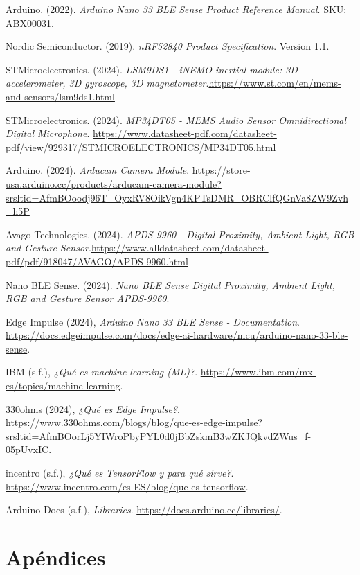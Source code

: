 \documentclass[12pt,a4paper]{article}
\begin{document}
\begin{thebibliography}{}
Arduino. (2022). \emph{Arduino Nano 33 BLE Sense Product Reference Manual}. SKU: ABX00031.

Nordic Semiconductor. (2019). \emph{nRF52840 Product Specification}. Version 1.1.  

STMicroelectronics. (2024). \emph{LSM9DS1 - iNEMO inertial module: 3D accelerometer, 3D gyroscope, 3D magnetometer}.\url{https://www.st.com/en/mems-and-sensors/lsm9ds1.html}

STMicroelectronics. (2024). \emph{MP34DT05 - MEMS Audio Sensor Omnidirectional Digital Microphone}. \url{https://www.datasheet-pdf.com/datasheet-pdf/view/929317/STMICROELECTRONICS/MP34DT05.html}


Arduino. (2024). \emph{Arducam Camera Module}. \url{https://store-usa.arduino.cc/products/arducam-camera-module?srsltid=AfmBOoodj96T_OyxRV8OikVgn4KPTsDMR_OBRClfQGnVa8ZW9Zvh_h5P}

Avago Technologies. (2024). \emph{APDS-9960 - Digital Proximity, Ambient Light, RGB and Gesture Sensor}.\url{https://www.alldatasheet.com/datasheet-pdf/pdf/918047/AVAGO/APDS-9960.html}

Nano BLE Sense. (2024). \emph{Nano BLE Sense Digital Proximity, Ambient Light, RGB and Gesture Sensor APDS-9960}. 

Edge Impulse (2024), \emph{Arduino Nano 33 BLE Sense - Documentation}.  \url{https://docs.edgeimpulse.com/docs/edge-ai-hardware/mcu/arduino-nano-33-ble-sense}.

IBM (s.f.), \emph{¿Qué es machine learning (ML)?}.  \url{https://www.ibm.com/mx-es/topics/machine-learning}.

330ohms (2024), \emph{¿Qué es Edge Impulse?}.  \url{https://www.330ohms.com/blogs/blog/que-es-edge-impulse?srsltid=AfmBOorLj5YIWroPbyPYL0d0jBbZskmB3wZKJQkvdZWus_f-05pUvxIC}.

incentro (s.f.), \emph{¿Qué es TensorFlow y para qué sirve?}.  \url{https://www.incentro.com/es-ES/blog/que-es-tensorflow}.

Arduino Docs (s.f.), \emph{Libraries}.  \url{https://docs.arduino.cc/libraries/}.

\end{thebibliography}



\section{Apéndices}



\end{document}
